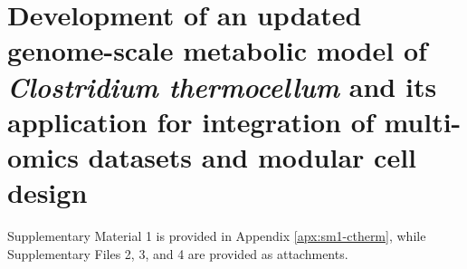 \chapter{Development of an updated genome-scale metabolic model of \textit{Clostridium thermocellum} and its application for integration of multi-omics datasets and modular cell design} \label{ch:ctherm}

Supplementary Material 1 is provided in Appendix \ref{apx:sm1-ctherm}, while Supplementary Files 2, 3, and 4 are provided as attachments.


\makeatletter
\newcommand\ko[1]{{\@for\tmp:=#1\do{\textit{$\Delta$\tmp}}}}
\makeatother

\newcommand\pFBA{\mathrm{pFBA}}
\newcommand\FVA{\mathrm{FVA}}
\renewcommand\sim{\mathrm{sim}}
\newcommand\meas{\mathrm{meas}}
\newcommand\FC{\mathit{FC}}

